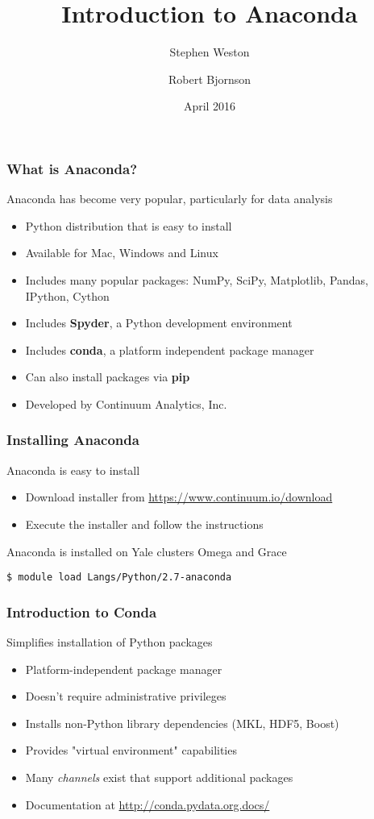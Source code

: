 \documentclass[10pt]{beamer}
\title{Introduction to Anaconda}
\author{{Stephen Weston} \and {Robert Bjornson}}
\institute[Yale]{
  Yale Center for Research Computing \\
  Yale University
}
\date{April 2016}
\begin{document}
\begin{frame}[plain]
  \titlepage
\end{frame}

\begin{frame}
\frametitle{What is Anaconda?}
Anaconda has become very popular, particularly for data analysis
\begin{itemize}
\item Python distribution that is easy to install
\item Available for Mac, Windows and Linux
\item Includes many popular packages:
  NumPy, SciPy, Matplotlib, Pandas, IPython, Cython
\item Includes \textbf{Spyder}, a Python development environment
\item Includes \textbf{conda}, a platform independent package manager
\item Can also install packages via \textbf{pip}
\item Developed by Continuum Analytics, Inc.
\end{itemize}
\end{frame}

\begin{frame}[fragile]
\frametitle{Installing Anaconda}
Anaconda is easy to install
\begin{itemize}
\item Download installer from \url{https://www.continuum.io/download}
\item Execute the installer and follow the instructions
\end{itemize}
\vskip10pt
Anaconda is installed on Yale clusters Omega and Grace
\begin{verbatim}
$ module load Langs/Python/2.7-anaconda
\end{verbatim}
\end{frame}

\begin{frame}
\frametitle{Introduction to Conda}
Simplifies installation of Python packages
\begin{itemize}
\item Platform-independent package manager
\item Doesn't require administrative privileges
\item Installs non-Python library dependencies (MKL, HDF5, Boost)
\item Provides "virtual environment" capabilities
\item Many \textit{channels} exist that support additional packages
\item Documentation at \url{http://conda.pydata.org.docs/}
\end{itemize}
\end{frame}
\end{document}
